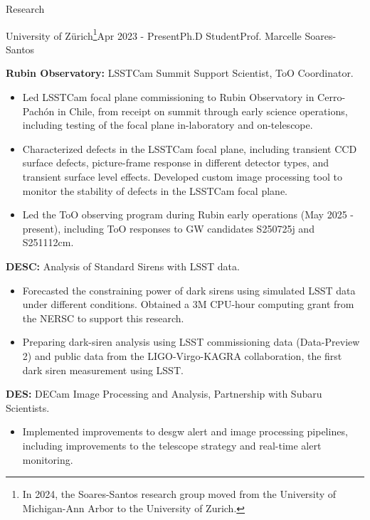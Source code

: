 \documentclass{resume} %
\begin{document}
\begin{rSection}{Research}

\begin{rSubsection}{University of Zürich\footnote{In 2024, the Soares-Santos research group moved from the University of Michigan-Ann Arbor to the University of Zurich.}}{Apr 2023 - Present}{Ph.D Student}{Prof. Marcelle Soares-Santos}

    \item \textbf{Rubin Observatory:} \ac{LSSTCam} Summit Support Scientist, \ac{ToO} Coordinator.
    \begin{itemize}
        \item Led \ac{LSSTCam} focal plane commissioning to Rubin Observatory in Cerro-Pachón in Chile, from receipt on summit through early science operations, including testing of the focal plane in-laboratory and on-telescope.
        \item Characterized defects in the \ac{LSSTCam} focal plane, including transient CCD surface defects, picture-frame response in different detector types, and transient surface level effects. Developed custom image processing tool to monitor the stability of defects in the \ac{LSSTCam} focal plane.
        \item Led the \ac{ToO} observing program during Rubin early operations (May 2025 - present), including \ac{ToO} responses to \ac{GW} candidates S250725j and S251112cm.
    \end{itemize}
    \item \textbf{\ac{DESC}:} Analysis of Standard Sirens with LSST data.
    \begin{itemize}
        \item Forecasted the constraining power of dark sirens using simulated \ac{LSST} data under different conditions. Obtained a 3M CPU-hour computing grant from the \ac{NERSC} to support this research.
        \item Preparing dark-siren analysis using LSST commissioning data (Data-Preview 2) and public data from the LIGO-Virgo-KAGRA collaboration, the first dark siren measurement using LSST.
    \end{itemize}
     \item \textbf{\ac{DES}:} \ac{DECam} Image Processing and Analysis, Partnership with Subaru Scientists.
     \begin{itemize}
         \item Implemented improvements to \ac{desgw} alert and image processing pipelines, including improvements to the telescope strategy and real-time alert monitoring.

\end{itemize}
\end{rSubsection}
\end{rSection}
\end{document}
